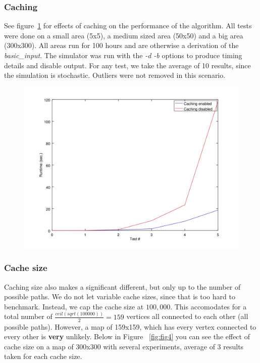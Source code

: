 \documentclass{article}
\begin{document}
	\subsubsection{Caching}
		See figure~\ref{fig:fig3} for effects of caching on the performance of the algorithm. All tests were done on a small area (5x5), a medium sized area (50x50)
		and a big area (300x300). All areas run for 100 hours and are otherwise a derivation of the \textit{basic\_input}. The simulator was run with the \textit{-d -b} options
		to produce timing details and disable output. For any test, we take the average of 10 results, since the simulation is stochastic. Outliers were not removed
		in this scenario.

		\begin{figure}[H]
		\centering
			\includegraphics[width=.55\columnwidth]{resources/caching_performance.jpg}
			\label{fig:fig3}
		\end{figure}

		\subsubsection{Cache size}
			Caching size also makes a significant different, but only up to the number of possible paths. We do not let variable cache sizes,
			since that is too hard to benchmark. Instead, we cap the cache size at $100,000$. This accomodates for a total number of $\frac{ceil(sqrt(100000))}{2} = 159$ vertices
			all connected to each other (all possible paths). However, a map of 159x159, which has every vertex connected to every other is \textbf{very} unlikely. Below in Figure ~\ref{fig:fig4}
			you can see the effect of cache size on a map of 300x300 with several experiments, average of 3 results taken for each cache size.
		
\end{document}

